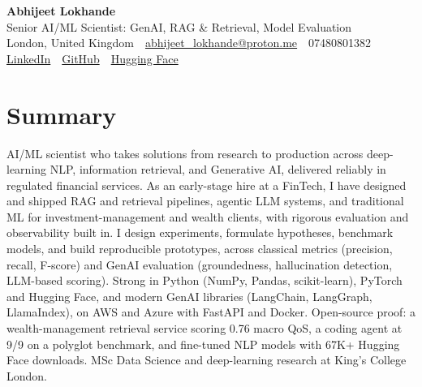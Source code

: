 \documentclass[10pt,a4paper]{article}
\newcommand{\sep}{\,\textcolor{accent!60}{\textbar}\,}
\begin{document}
\begin{center}
  {\fontsize{24}{26}\selectfont\bfseries Abhijeet Lokhande}\\[3pt]
  {\color{accent}\large Senior AI/ML Scientist: GenAI, RAG \& Retrieval, Model Evaluation}\\[5pt]
  {\small
    London, United Kingdom \sep
    \href{mailto:abhijeet_lokhande@proton.me}{abhijeet\_lokhande@proton.me} \sep
    07480801382 \\[2pt]
    \href{https://www.linkedin.com/in/ablds/}{LinkedIn} \sep
    \href{https://github.com/abhijeetscode}{GitHub} \sep
    \href{https://huggingface.co/ab-ai}{Hugging Face}
  }
\end{center}
\vspace{2pt}

\section{Summary}
AI/ML scientist who takes solutions from research to production across deep-learning NLP, information retrieval, and Generative AI, delivered reliably in regulated financial services. As an early-stage hire at a FinTech, I have designed and shipped RAG and retrieval pipelines, agentic LLM systems, and traditional ML for investment-management and wealth clients, with rigorous evaluation and observability built in. I design experiments, formulate hypotheses, benchmark models, and build reproducible prototypes, across classical metrics (precision, recall, F-score) and GenAI evaluation (groundedness, hallucination detection, LLM-based scoring). Strong in Python (NumPy, Pandas, scikit-learn), PyTorch and Hugging Face, and modern GenAI libraries (LangChain, LangGraph, LlamaIndex), on AWS and Azure with FastAPI and Docker. Open-source proof: a wealth-management retrieval service scoring 0.76 macro QoS, a coding agent at 9/9 on a polyglot benchmark, and fine-tuned NLP models with 67K+ Hugging Face downloads. MSc Data Science and deep-learning research at King's College London.

\end{document}

